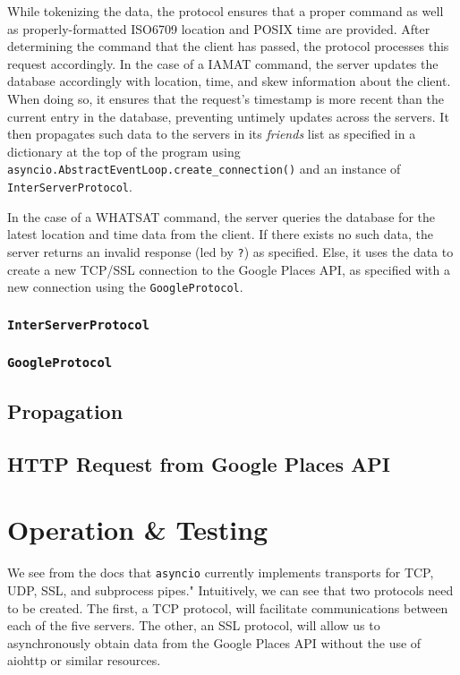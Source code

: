 \documentclass[letterpaper,twocolumn,10pt]{article}
\begin{document}
While tokenizing the data, the protocol ensures that a proper command as well as properly-formatted ISO6709 location and POSIX time are provided. After determining the command that the client has passed, the protocol processes this request accordingly. In the case of a IAMAT command, the server updates the database accordingly with location, time, and skew information about the client. When doing so, it ensures that the request's timestamp is more recent than the current entry in the database, preventing untimely updates across the servers. It then propagates such data to the servers in its \textit{friends} list as specified in a dictionary at the top of the program using \texttt{asyncio.AbstractEventLoop.create\_connection()} and an instance of \texttt{InterServerProtocol}. 

In the case of a WHATSAT command, the server queries the database for the latest location and time data from the client. If there exists no such data, the server returns an invalid response (led by \texttt{?}) as specified. Else, it uses the data to create a new TCP/SSL connection to the Google Places API, as specified with a new connection using the \texttt{GoogleProtocol}.

\subsubsection{\texttt{InterServerProtocol}}

\subsubsection{\texttt{GoogleProtocol}}

\subsection{Propagation}

\subsection{HTTP Request from Google Places API}

\section{Operation \& Testing}

We see from the docs that \texttt{asyncio} currently implements transports for TCP, UDP, SSL, and subprocess pipes." Intuitively, we can see that two protocols need to be created. The first, a TCP protocol, will facilitate communications between each of the five servers. The other, an SSL protocol, will allow us to asynchronously obtain data from the Google Places API without the use of aiohttp or similar resources.
\end{document}
